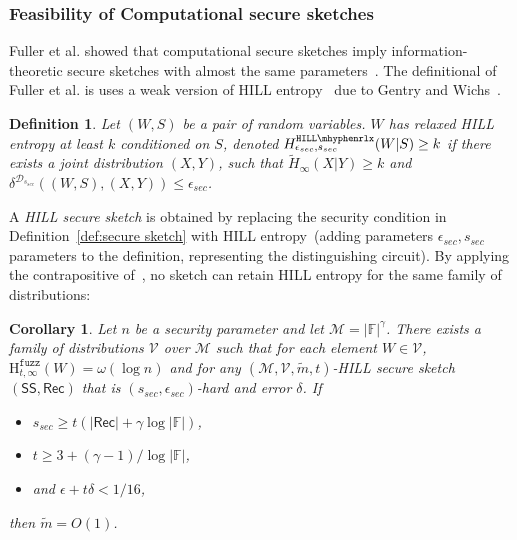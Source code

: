 \documentclass[11pt]{article}
\newcommand{\defref}[1]{\mbox{Definition~\ref{#1}}}
\newcommand{\class}[1]{{\ensuremath{\mathsf{#1}}}}
\newcommand{\sketch}{\ensuremath{\class{SS}}\xspace}
\newcommand{\rec}{\ensuremath{\class{Rec}}\xspace}
\newcommand{\hillrlx}{\ensuremath{\mathtt{HILL\mhyphen rlx}}\xspace}
\newcommand{\Hfuzz}{\mathrm{H}^{\mathtt{fuzz}}_{t,\infty}}
\newtheorem{corollary}[theorem]{Corollary}
\newtheorem{definition}[theorem]{Definition}
\begin{document}
\subsubsection{Feasibility of Computational secure sketches}
Fuller et al. showed that computational secure sketches imply information-theoretic secure sketches with almost the same parameters~\cite[Corollary 3.8]{fuller2013computational}.  %
The definitional of Fuller et al. is uses a weak version of HILL entropy~\cite{DBLP:journals/siamcomp/HastadILL99} due to Gentry and Wichs~\cite{gentry2011separating}.

\begin{definition}
\label{def:relaxed hill}
Let $(W, S)$ be a pair of random variables.  $W$ has 
\emph{relaxed HILL entropy} at least $k$ conditioned on $S$,
denoted $H^{\hillrlx}_{\epsilon_{sec}, s_{sec}}(W|S)\geq k$ if there exists a joint distribution $(X, Y)$, such that $\tilde{H}_\infty(X|Y)\geq k$ and $\delta^{\mathcal{D}_{s_{sec}}} ((W, S),(X,Y))\leq \epsilon_{sec}$.
\end{definition}

A \emph{HILL secure sketch} is obtained by replacing the security condition in \defref{def:secure sketch} with HILL entropy~(adding parameters $\epsilon_{sec}, s_{sec}$ parameters to the definition, representing the distinguishing circuit).  By applying the contrapositive of~\cite[Corollary 3.8]{fuller2013computational}, no sketch can retain HILL entropy for the same family of distributions:

\begin{corollary}
\label{cor:imposs comp sketch}
Let $n$ be a security parameter and let $\mathcal{M} = |\mathbb{F}|^\gamma$.  There exists a family of distributions $\mathcal{V}$ over $\mathcal{M}$ such that for each element $W\in \mathcal{V}$, $\Hfuzz(W)= \omega(\log n)$ and for any $(\mathcal{M}, \mathcal{V}, \tilde{m}, t)$-HILL secure sketch $(\sketch, \rec)$ that is $(s_{sec}, \epsilon_{sec})$-hard and error $\delta$.  If 
\begin{itemize}
\item $s_{sec}\ge t(|\rec| + \gamma \log |\mathbb{F}|)$, 
\item $t\ge 3 + (\gamma-1)/\log |\mathbb{F}|$,
\item and $\epsilon + t\delta < 1/16$,
\end{itemize}
 then $\tilde{m} =O(1)$.
\end{corollary}
\end{document}
